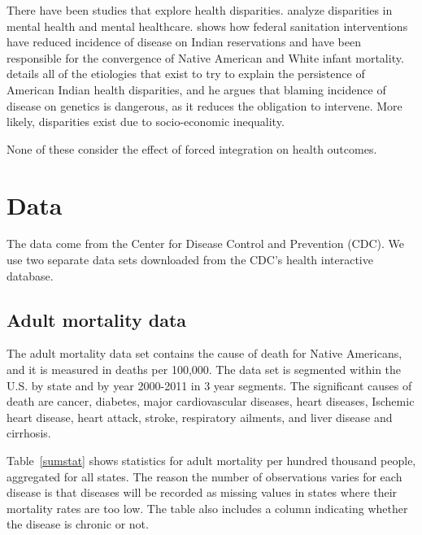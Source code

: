 \documentclass[12pt]{article}
\begin{document}
There have been studies that explore health disparities.
\cite{mcguire2008new} analyze disparities in mental health and mental healthcare.
\cite{watson2006public} shows how federal sanitation interventions have reduced incidence of disease on Indian reservations and have been responsible for the convergence of Native American and White infant mortality.
\cite{jones2006persistence} details all of the etiologies that exist to try to explain the persistence of American Indian health disparities, and he argues that blaming incidence of disease on genetics is dangerous, as it reduces the obligation to intervene. More likely, disparities exist due to socio-economic inequality.

None of these consider the effect of forced integration on health outcomes.

\section{Data}
The data come from the Center for Disease Control and Prevention (CDC). We use two separate data sets downloaded from the CDC's health interactive database.

\subsection{Adult mortality data}
The adult mortality data set contains the cause of death for Native Americans, and it is measured in deaths per 100,000.
The data set is segmented within the U.S. by state and by year 2000-2011 in 3 year segments.
The significant causes of death are cancer, diabetes, major cardiovascular diseases, heart diseases, Ischemic heart disease, heart attack, stroke, respiratory ailments, and liver disease and cirrhosis.

Table~\ref{sumstat} shows statistics for adult mortality per hundred thousand people, aggregated for all states.
The reason the number of observations varies for each disease is that diseases will be recorded as missing values in states where their mortality rates are too low.
The table also includes a column indicating whether the disease is chronic or not.
\end{document}
